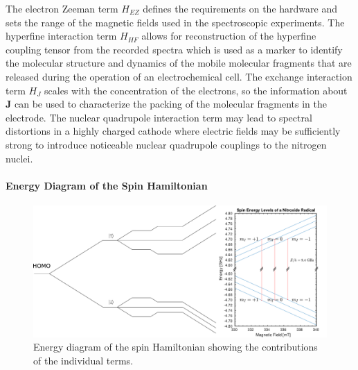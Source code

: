 The electron Zeeman term $H_{EZ}$ defines the requirements on the hardware and sets the range of the magnetic fields used in the spectroscopic experiments. The hyperfine interaction term $H_{HF}$ allows for reconstruction of the hyperfine coupling tensor from the recorded spectra which is used as a marker to identify the molecular structure and dynamics of the mobile molecular fragments that are released during the operation of an electrochemical cell. The exchange interaction term $H_{J}$ scales with the concentration of the electrons, so the information about $\textbf{J}$ can be used to characterize the packing of the molecular fragments in the electrode. The nuclear quadrupole interaction term may lead to spectral distortions in a highly charged cathode where electric fields may be sufficiently strong to introduce noticeable nuclear quadrupole couplings to the nitrogen nuclei.

\paragraph{Energy Diagram of the Spin Hamiltonian}

\begin{figure}[h]
\center
	\includegraphics[width=1.0\textwidth]{./operando_epr/figures/energy_diagram.pdf}
	\caption{Energy diagram of the spin Hamiltonian showing the contributions of the individual terms.}
	\label{fig:energy_diagram}
\end{figure}



